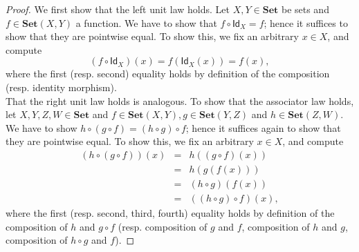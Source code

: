 \documentclass[a4paper,11pt, oneside,titlepage=false]{scrbook}
\theoremstyle{plain}
\theoremstyle{definition}
\newcommand{\cfont}[1]{\ensuremath{\mathsf{#1}}}
\newcommand{\Catb}[1]{\mathbf{#1}}
\newcommand{\SET}{\Catb{Set}}
\newcommand{\CHom}[3]{{#1}(#2,#3)}
\newcommand{\Id}[1][]{\cfont{Id}_{#1}}
\newcommand{\co}[2]{\ensuremath{#2 \circ #1}}
\begin{document}
\begin{proof}
  We first show that the left unit law holds. Let $X,Y\in \mathbf{Set}$ be sets and $f\in \CHom \SET X Y$ a function. We have to show that $\co {\Id[X]}{f} = f$; hence it suffices to show that they are pointwise equal.
  To show this, we fix an arbitrary $x \in X$, and compute
\[
   (f\circ \Id[X])(x) = f\left(\Id[X](x)\right) = f(x),
\]
where the first (resp. second) equality holds by definition of the composition (resp. identity morphism).\\
That the right unit law holds is analogous. To show that the associator law holds, let $X,Y,Z,W\in\mathbf{Set}$ and $f\in \CHom \SET X Y, g\in \CHom \SET Y Z$ and $h\in \CHom \SET Z W$. We have to show $h\circ (g\circ f) = (h\circ g)\circ f$; hence it suffices again to show that they are pointwise equal.
To show this, we fix an arbitrary $x \in X$, and compute
\begin{eqnarray*}
  \left(h\circ (g\circ f)\right)(x) &=& h\left((g\circ f)(x)\right)
  \\ 
                                    &=& h(g(f(x)))
  \\ 
                                    &=& (h\circ g)(f(x))
  \\ 
                                    &=& \left((h\circ g)\circ f\right)(x),
\end{eqnarray*}
where the first (resp. second, third, fourth) equality holds by definition of the composition of $h$ and $g\circ f$ (resp. composition of $g$ and $f$, composition of $h$ and $g$, composition of $h\circ g$ and $f$).
\end{proof}
\end{document}
